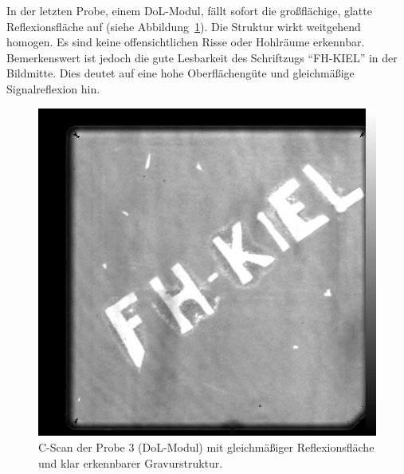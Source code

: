 In der letzten Probe, einem DoL-Modul, fällt sofort die großflächige, glatte Reflexionsfläche auf (siehe Abbildung~\ref{Abbildung 10:probe3}). Die Struktur wirkt weitgehend homogen. Es sind keine offensichtlichen Risse oder Hohlräume erkennbar. Bemerkenswert ist jedoch die gute Lesbarkeit des Schriftzugs \enquote{FH-KIEL} in der Bildmitte. Dies deutet auf eine hohe Oberflächengüte und gleichmäßige Signalreflexion hin.
\vspace{0.2cm}
\begin{figure}[htbp]
    \centering
    \includegraphics[scale=0.30]{Bilder/Probe3_i795_c.jpg}
    \caption{C-Scan der Probe 3 (DoL-Modul) mit gleichmäßiger Reflexionsfläche und klar erkennbarer Gravurstruktur.}
    \label{Abbildung 10:probe3}
\end{figure}
